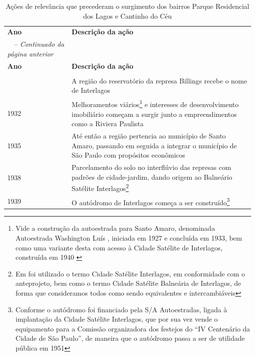 	\begin{center}
		\begin{longtable}{|l|p{12cm}|}
			\hiderowcolors
			\caption[Ações relevantes anteriores ao surgimento do Cantinho do Céu]{Ações de relevância que precederam o surgimento dos bairros Parque Residencial dos Lagos e Cantinho do Céu} \label{tab:acoes_pre_ocupacao}\\
			\hline
			\textbf{Ano} & \textbf{Descrição da ação} \\
			\showrowcolors
			\hline
			\endfirsthead
			\multicolumn{2}{c}%
			{\tablename\ \thetable\ -- \textit{Continuado da página anterior}} \\
			\hline
			\hiderowcolors
			\textbf{Ano} & \textbf{Descrição da ação} \\
			\showrowcolors
			\hline
			\endhead
			\hline \multicolumn{2}{r}{\textit{Continua na próxima página}} \\
			\endfoot
			\hline
			\endlastfoot
			1927 & A região do reservatório da represa Billings recebe o nome de Interlagos \\
			1932 & Melhoramentos viários\footnote{Vide a construção da autoestrada para Santo Amaro, denominada Autoestrada Washington Luís \cite[p.51]{Francca2000}, iniciada em 1927 e concluída em 1933, bem como uma variante desta com acesso à Cidade Satélite de Interlagos, construída em 1940 \cite[p.49]{Francca2000}} e interesses de desenvolvimento imobiliário começam a surgir junto a empreendimentos como a Riviera Paulista \\
			1935 & Até então a região pertencia ao município de Santo Amaro, passando em seguida a integrar o município de São Paulo com propósitos econômicos \\
			1938 & Parcelamento do solo no interflúvio das represas com padrões de cidade-jardim, dando origem ao Balneário Satélite Interlagos\footnote{Em \citeonline[p.51; p.56-57]{Francca2000} foi utilizado o termo Cidade Satélite Interlagos, em conformidade com o anteprojeto, bem como o termo Cidade Satélite Balneária de Interlagos, de forma que consideramos todos como sendo equivalentes e intercambiáveis} \\
			1939 & O autódromo de Interlagos começa a ser construído\footnote{Conforme \citeonline[p.51]{Francca2000} o autódromo foi financiado pela S/A Autoestradas, ligada à implantação da Cidade Satélite Interlagos, que por sua vez vende o equipamento para a Comissão organizadora dos festejos do ``IV Centenário da Cidade de São Paulo'', de maneira que o autódromo passa a ser de utilidade pública em 1951} \\

\end{longtable}
\end{center}
